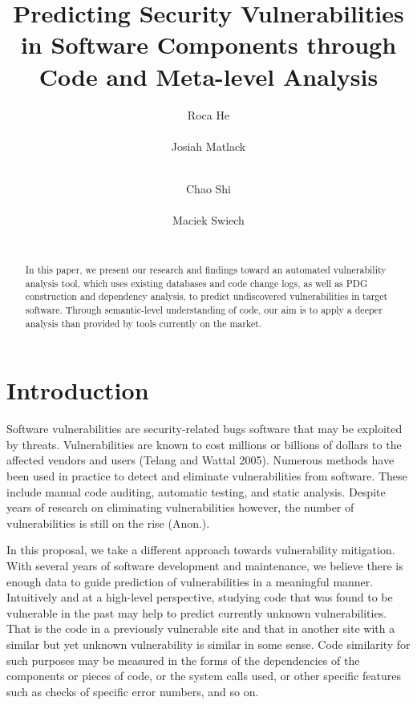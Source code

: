 \documentclass{acm_proc_article-sp}
\begin{document}
\title{Predicting Security Vulnerabilities in Software Components through Code 
and Meta-level Analysis}

\author{
\alignauthor
Roca He\\
    \\
\alignauthor
Josiah Matlack\\
    \\
\and
\alignauthor
Chao Shi\\
    \\
\alignauthor
Maciek Swiech\\
    \\
}

\maketitle
\begin{abstract}
In this paper, we present our research and findings toward an automated 
vulnerability analysis tool, which uses existing databases and code change 
logs, as well as PDG construction and dependency analysis, to predict 
undiscovered vulnerabilities in target software. Through semantic-level 
understanding of code, our aim is to apply a deeper analysis than provided by 
tools currently on the market.
\end{abstract}

\section{Introduction}
Software vulnerabilities are security-related bugs software that may be 
exploited by threats. Vulnerabilities are known to cost millions or billions of 
dollars to the affected vendors and users (Telang and Wattal 2005). Numerous 
methods have been used in practice to detect and eliminate vulnerabilities from 
software. These include manual code auditing, automatic testing, and static 
analysis. Despite years of research on eliminating vulnerabilities however, the 
number of vulnerabilities is still on the rise (Anon.).

In this proposal, we take a different approach towards vulnerability 
mitigation. With several years of software development and maintenance, we 
believe there is enough data to guide prediction of vulnerabilities in a 
meaningful manner. Intuitively and at a high-level perspective, studying code 
that was found to be vulnerable in the past may help to predict currently 
unknown vulnerabilities. That is the code in a previously vulnerable site and 
that in another site with a similar but yet unknown vulnerability is similar 
in some sense. Code similarity for such purposes may be measured in the forms 
of the dependencies of the components or pieces of code, or the system calls 
used, or other specific features such as checks of specific error numbers, and 
so on.
\end{document}
